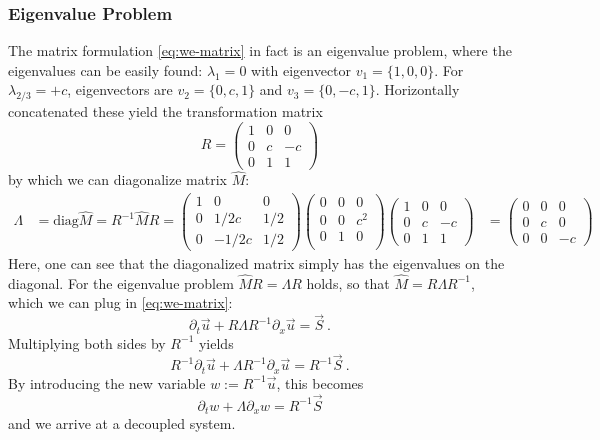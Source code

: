 \subsubsection{Eigenvalue Problem}
The matrix formulation \ref{eq:we-matrix} in fact is an eigenvalue problem, where the eigenvalues can be easily found: $\lambda_1 = 0$ with eigenvector $v_1 = \{1,0,0\}$. For $\lambda_{2/3} = + c$, eigenvectors are $v_2 = \{0,c,1\}$ and $v_3 = \{0, -c, 1\}$.
Horizontally concatenated these yield the transformation matrix
\[  R =
\begin{pmatrix}
	1 & 0 & 0 \\
	0 & c & -c \\
	0 & 1 & 1
\end{pmatrix}
\]
by which we can diagonalize matrix $\hat{M}$:
\begin{align*}
	\Lambda &= \text{diag} \hat{M} = R^{-1} \hat{M} R =
	\begin{pmatrix}
	1 & 0 	  & 0 	\\
	0 & 1/2c  & 1/2 \\
	0 & -1/2c & 1/2
	\end{pmatrix}
	\begin{pmatrix}
		0 & 0 & 0 \\
		0 & 0 & c^2 \\
		0 & 1 & 0 \\
	\end{pmatrix}
	\begin{pmatrix}
	1 & 0 & 0 \\
	0 & c & -c \\
	0 & 1 & 1
	\end{pmatrix}
 &=
	\begin{pmatrix}
	0 & 0 & 0 \\
	0 & c & 0 \\
	0 & 0 & -c
	\end{pmatrix}
\end{align*}
Here, one can see that the diagonalized matrix simply has the eigenvalues on the diagonal.
For the eigenvalue problem $\hat{M} R = \Lambda R$ holds, so that $\hat{M} = R \Lambda R^{-1}$, which we can plug in \ref{eq:we-matrix}:
\begin{equation}
	\partial_t \vec{u} +  R \Lambda R^{-1} \partial_x \vec{u} = \vec{S}~.
\end{equation}
Multiplying both sides by $R^{-1}$ yields
\begin{equation}
	R^{-1} \partial_t \vec{u} +  \Lambda R^{-1} \partial_x \vec{u} = R^{-1} \vec{S}~.
\end{equation}
By introducing the new variable $w := R^{-1} \vec{u}$, this becomes
\begin{equation}
\partial_t w +  \Lambda \partial_x w = R^{-1} \vec{S}
\end{equation}
and we arrive at a decoupled system.


